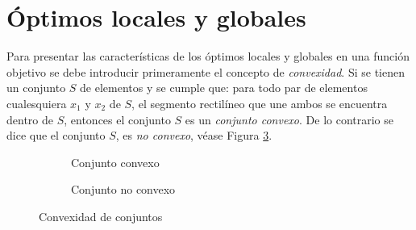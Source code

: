 \section{Óptimos locales y globales}
Para presentar las características de los óptimos locales y globales en una función objetivo se debe introducir primeramente el concepto de \textit{convexidad}. Si se tienen un conjunto $S$ de elementos y se cumple que: para todo par de elementos cualesquiera $x_1$ y $x_2$ de $S$, el segmento rectilíneo que une ambos se encuentra dentro de $S$, entonces el conjunto $S$ es un \textit{conjunto convexo}. De lo contrario se dice que el  conjunto $S$, es \textit{no convexo}, véase Figura \ref{fig:Conjunto convexo}. 

\begin{figure}[h]
\centering 
  \begin{subfigure}[b]{0.45\linewidth}
    \caption{Conjunto convexo} \label{fig:M1}  
  \end{subfigure}
\begin{subfigure}[b]{0.45\linewidth}
\caption{Conjunto no convexo} \label{fig:M2}  
 \end{subfigure}
\caption{Convexidad de conjuntos} \label{fig:Conjunto convexo}
\end{figure}
	 

